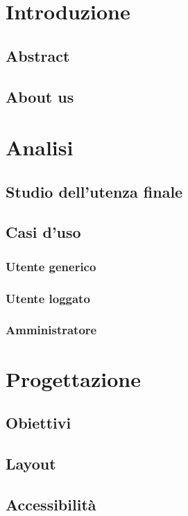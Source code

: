 \documentclass[a4paper, oneside, openany, dvipsnames, table]{article}
\begin{document}
\tableofcontents
\newpage
\section{Introduzione}
	\subsection{Abstract}
	\subsection{About us}
	
\newpage
\section{Analisi}
	\subsection{Studio dell'utenza finale}
	
	\subsection{Casi d'uso}
		\subsubsection{Utente generico}
		\subsubsection{Utente loggato}
		\subsubsection{Amministratore}

\newpage
\section{Progettazione}
	\subsection{Obiettivi}
	\subsection{Layout}
	\subsection{Accessibilità}
\end{document}

